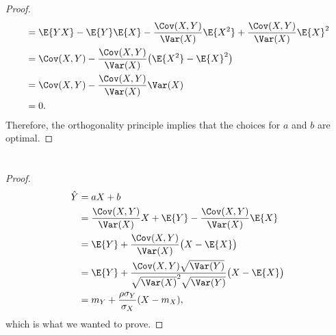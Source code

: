 \documentclass[
  coursecode={MTHE 477},
  assignmentname={Homework \homeworknumber},
  studentnumber=20053722,
  name={Bryan Hoang},
  draft,
]{
  ltxanswer%
}
\begin{document}
\begin{questions}
\begin{parts}
\begin{solution}
\begin{proof}
\begin{align*}
             &= \E{Y X} - \E{Y} \E{X} - \frac{\Cov(X, Y)}{\Var(X)} \E{X^{2}} + \frac{\Cov(X, Y)}{\Var(X)} \E{X}^{2}                           \\
             &= \Cov(X, Y) - \frac{\Cov(X, Y)}{\Var(X)} \bigl(\E{X^{2}} - \E{X}^{2}\bigr)                                                     \\
             &= \Cov(X, Y) - \frac{\Cov(X, Y)}{\Var(X)} \Var(X)                                                                               \\
             &= 0.
          \end{align*}
          Therefore, the orthogonality principle implies that the choices for \(a\) and \(b\) are optimal.
        \end{proof}
      \end{solution}

      \part{}
      \begin{solution}
        \begin{proof}
          \begin{align*}
            \hat{Y} &= a X + b                                                                                           \\
                    &= \frac{\Cov(X, Y)}{\Var(X)} X + \E{Y} - \frac{\Cov(X, Y)}{\Var(X)} \E{X}                           \\
                    &= \E{Y} + \frac{\Cov(X, Y)}{\Var(X)} \bigl(X - \E{X}\bigr)                                          \\
                    &= \E{Y} + \frac{\Cov(X, Y) \sqrt{\Var(Y)}}{\sqrt{\Var(X)}^{2} \sqrt{\Var(Y)}} \bigl(X - \E{X}\bigr) \\
                    &= m_{Y} + \frac{\rho \sigma_{Y}}{\sigma_{X}} (X - m_{X}),
          \end{align*}
          which is what we wanted to prove.
        \end{proof}
      \end{solution}


\end{parts}
\end{questions}
\end{document}
